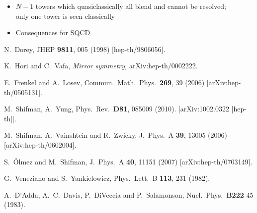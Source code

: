 \documentclass[epsfig,12pt]{article}
\begin{document}
\begin{itemize}
\item
	$ N - 1 $ towers which quasiclassically all blend and cannot be resolved;\\
	only one tower is seen classically

\item
	Consequences for SQCD

\end{itemize}
\vspace{2.0cm}

\begin{thebibliography}{99}

N.~Dorey,
JHEP {\bf 9811}, 005 (1998) [hep-th/9806056].

  K.~Hori and C.~Vafa,
{\em Mirror symmetry,}
  arXiv:hep-th/0002222.
  
E.~Frenkel and A.~Losev,
  Commun.\ Math.\ Phys.\  {\bf 269}, 39 (2006)
  [arXiv:hep-th/0505131].

  M.~Shifman, A.~Yung,
  Phys.\ Rev.\  {\bf D81}, 085009 (2010).
  [arXiv:1002.0322 [hep-th]].

  M.~Shifman, A.~Vainshtein and R.~Zwicky,
  J.\ Phys.\ A  {\bf 39}, 13005 (2006)
  [arXiv:hep-th/0602004].

  S.~\"{O}lmez and M.~Shifman,
  J.\ Phys.\ A  {\bf 40}, 11151 (2007)
  [arXiv:hep-th/0703149].

 G.~Veneziano and S.~Yankielowicz,
  Phys.\ Lett.\  B {\bf 113}, 231 (1982).

A.~D'Adda, A.~C.~Davis, P.~DiVeccia and P.~Salamonson,
Nucl.\ Phys.\ {\bf B222} 45 (1983).


\end{thebibliography}
\end{document}
